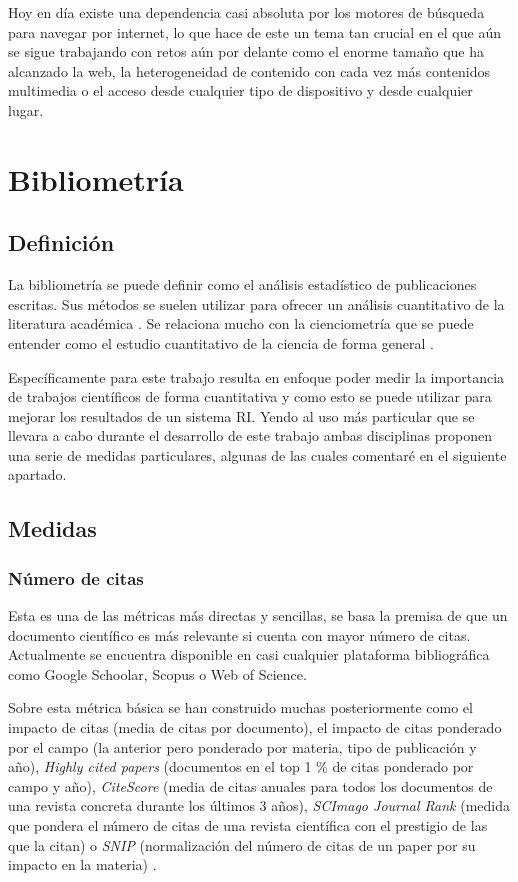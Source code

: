 Hoy en día existe una dependencia casi absoluta por los motores de búsqueda para navegar por internet, lo que hace de este un tema tan crucial en el que aún se sigue trabajando con retos aún por delante como el enorme tamaño que ha alcanzado la web, la heterogeneidad de contenido con cada vez más contenidos multimedia o el acceso desde cualquier tipo de dispositivo y desde cualquier lugar. 

\section{Bibliometría}
\subsection{Definición}
La bibliometría se puede definir como el análisis estadístico de publicaciones escritas. Sus métodos se suelen utilizar para ofrecer un análisis cuantitativo de la literatura académica \cite{de2009bibliometrics}. Se relaciona mucho con la cienciometría que se puede entender como el estudio cuantitativo de la ciencia de forma general \cite{DBLP:journals/corr/abs-1208-4566}. 

Específicamente para este trabajo resulta en enfoque poder medir la importancia de trabajos científicos de forma cuantitativa y como esto se puede utilizar para mejorar los resultados de un sistema RI. Yendo al uso más particular que se llevara a cabo durante el desarrollo de este trabajo ambas disciplinas proponen una serie de medidas particulares, algunas de las cuales comentaré en el siguiente apartado.

\subsection{Medidas}
\subsubsection{Número de citas} \label{numero_citas}
Esta es una de las métricas más directas y sencillas, se basa la premisa de que un documento científico es más relevante si cuenta con mayor número de citas. Actualmente se encuentra disponible en casi cualquier plataforma bibliográfica como Google Schoolar, Scopus o Web of Science. 

Sobre esta métrica básica se han construido muchas posteriormente como el impacto de citas (media de citas por documento), el impacto de citas ponderado por el campo (la anterior pero ponderado por materia, tipo de publicación y año), \textit{Highly cited papers} (documentos en el top 1 \% de citas ponderado por campo y año)\cite{BibliometricWhitePaper}, \textit{CiteScore} (media de citas anuales para todos los documentos de una revista concreta durante los últimos 3 años), \textit{SCImago Journal Rank} (medida que pondera el número de citas de una revista científica con el prestigio de las que la citan) o \textit{SNIP} (normalización del número de citas de un paper por su impacto en la materia) \cite{bibliometric_measures}.
